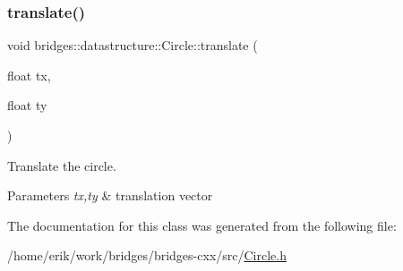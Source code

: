\subsubsection{\texorpdfstring{translate()}{translate()}}
{\footnotesize\ttfamily void bridges\+::datastructure\+::\+Circle\+::translate (\begin{DoxyParamCaption}\item[{float}]{tx,  }\item[{float}]{ty }\end{DoxyParamCaption})\hspace{0.3cm}{\ttfamily [inline]}}



Translate the circle. 


\begin{DoxyParams}{Parameters}
{\em tx,ty} & translation vector \\
\hline
\end{DoxyParams}


The documentation for this class was generated from the following file\+:\begin{DoxyCompactItemize}
\item 
/home/erik/work/bridges/bridges-\/cxx/src/\hyperlink{_circle_8h}{Circle.\+h}\end{DoxyCompactItemize}
